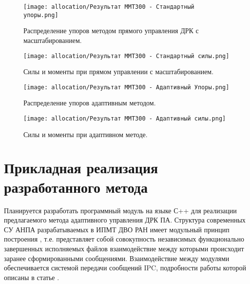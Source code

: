 \begin{figure}[ht]
    \centering
    \texttt{[image: allocation/Результат ММТ300 - Стандартный упоры.png]}
    \caption{Распределение упоров методом прямого управления ДРК с масштабированием.}
    \label{fig:mmt-300-allocation-fix-thrust}
\end{figure}

\begin{figure}[ht]
    \centering
    \texttt{[image: allocation/Результат ММТ300 - Стандартный силы.png]}
    \caption{Силы и моменты при прямом управлении с масштабированием.}
    \label{fig:mmt-300-allocation-fix-force}
\end{figure}

\begin{figure}[ht]
    \centering
    \texttt{[image: allocation/Результат ММТ300 - Адаптивный Упоры.png]}
    \caption{Распределение упоров адаптивным методом.}
    \label{fig:mmt-300-allocation-optimal-thrust}
\end{figure}

\begin{figure}[ht]
    \centering
    \texttt{[image: allocation/Результат ММТ300 - Адаптивный силы.png]}
    \caption{Силы и моменты при адаптивном методе.}
    \label{fig:mmt-300-allocation-optimal-force}
\end{figure}

\section{Прикладная реализация разработанного метода} \label{sec:Allocation/Software}
Планируется разработать программный модуль на языке С++ для реализации предлагаемого метода адаптивного управления ДРК ПА.
Структура современных СУ АНПА разрабатываемых в ИПМТ ДВО РАН имеет модульный принцип построения \cite{борейко2019система, инзарцев2015реконфигурируемая}, т.е. представляет собой совокупность независимых функционально завершенных исполняемых файлов взаимодействие между которыми происходит заранее сформированными сообщениями.
Взаимодействие между модулями обеспечивается системой передачи сообщений IPC, подробности работы которой описаны в статье \cite{pavin2016reconfigurable}.

